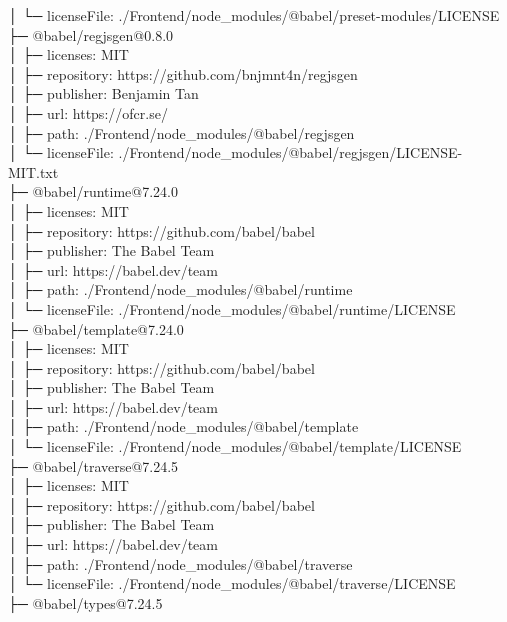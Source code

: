\documentclass[
    paper=a4,
    twoside=false,
    parskip=half,
    listof=entryprefix,
    listof=totoc,
    index=totoc,
    bibliography=totoc,
    headsepline,
]{scrbook}
\begin{document}
    │  └─ licenseFile: ./Frontend/node\_modules/@babel/preset-modules/LICENSE\\
    ├─ @babel/regjsgen@0.8.0\\
    │  ├─ licenses: MIT\\
    │  ├─ repository: https://github.com/bnjmnt4n/regjsgen\\
    │  ├─ publisher: Benjamin Tan\\
    │  ├─ url: https://ofcr.se/\\
    │  ├─ path: ./Frontend/node\_modules/@babel/regjsgen\\
    │  └─ licenseFile: ./Frontend/node\_modules/@babel/regjsgen/LICENSE-MIT.txt\\
    ├─ @babel/runtime@7.24.0\\
    │  ├─ licenses: MIT\\
    │  ├─ repository: https://github.com/babel/babel\\
    │  ├─ publisher: The Babel Team\\
    │  ├─ url: https://babel.dev/team\\
    │  ├─ path: ./Frontend/node\_modules/@babel/runtime\\
    │  └─ licenseFile: ./Frontend/node\_modules/@babel/runtime/LICENSE\\
    ├─ @babel/template@7.24.0\\
    │  ├─ licenses: MIT\\
    │  ├─ repository: https://github.com/babel/babel\\
    │  ├─ publisher: The Babel Team\\
    │  ├─ url: https://babel.dev/team\\
    │  ├─ path: ./Frontend/node\_modules/@babel/template\\
    │  └─ licenseFile: ./Frontend/node\_modules/@babel/template/LICENSE\\
    ├─ @babel/traverse@7.24.5\\
    │  ├─ licenses: MIT\\
    │  ├─ repository: https://github.com/babel/babel\\
    │  ├─ publisher: The Babel Team\\
    │  ├─ url: https://babel.dev/team\\
    │  ├─ path: ./Frontend/node\_modules/@babel/traverse\\
    │  └─ licenseFile: ./Frontend/node\_modules/@babel/traverse/LICENSE\\
    ├─ @babel/types@7.24.5\\
\end{document}
